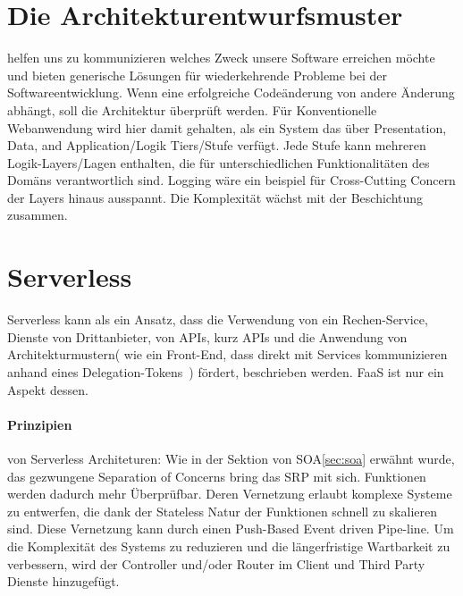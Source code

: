 \documentclass[
12pt,
english,
ngerman,
headsepline,
twoside,
openright,
numbers=noenddot,version=first
]{scrreprt}
\begin{document}
\section{Die Architekturentwurfsmuster} helfen uns zu kommunizieren welches Zweck unsere Software erreichen möchte und bieten generische Lösungen für wiederkehrende Probleme bei der Softwareentwicklung.
Wenn eine erfolgreiche Codeänderung von andere Änderung abhängt, soll die Architektur überprüft werden.
Für Konventionelle Webanwendung wird hier damit gehalten, als ein System das über Presentation, Data, and Application/Logik Tiers/Stufe verfügt. Jede Stufe kann mehreren Logik-Layers/Lagen enthalten, die für unterschiedlichen Funktionalitäten des Domäns verantwortlich sind. Logging wäre ein beispiel für Cross-Cutting Concern der Layers hinaus ausspannt. Die Komplexität wächst mit der Beschichtung zusammen.\\


\section{Serverless}
\label{sec:serverless}

Serverless kann als ein Ansatz, dass  die Verwendung von ein Rechen-Service, Dienste von Drittanbieter, von \acrfull{API}s, kurz \acrshort{API}s und die Anwendung von Architekturmustern( wie ein Front-End, dass direkt mit Services kommunizieren anhand eines \glqq Delegation-Tokens\grqq\ ) fördert, beschrieben werden. \acrshort{FaaS} ist nur ein Aspekt dessen.



\paragraph{Prinzipien}\label{par:serverless-principles} von Serverless Architeturen: \cite{serverlessArchAWS}
Wie in der Sektion von SOA\ref{sec:soa} erwähnt wurde, das gezwungene Separation of Concerns bring das \acrfull{SRP} mit sich. Funktionen werden dadurch mehr Überprüfbar.
Deren Vernetzung erlaubt komplexe Systeme zu entwerfen, die dank der Stateless Natur der Funktionen schnell zu skalieren sind.
Diese Vernetzung kann durch einen Push-Based Event driven Pipe-line.
Um die Komplexität des Systems zu reduzieren und die längerfristige Wartbarkeit zu verbessern, wird der Controller und/oder Router im Client und Third Party Dienste hinzugefügt.
\end{document}
